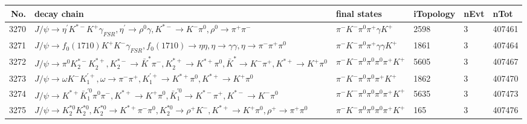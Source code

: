 \begin{table}[htbp] 
\begin{center}
\begin{small}
\begin{tabular}{rlllll}\hline\hline
 No. & decay chain & final states &  iTopology & nEvt & nTot \\\hline
3270&$J/\psi       \rightarrow \eta^{\prime} K^{*-}         K^{+}          \gamma_{FSR} , \eta^{\prime}  \rightarrow \rho^{0}      \gamma       , K^{*-}          \rightarrow K^{-}          \pi^{0}        , \rho^{0}       \rightarrow \pi^{+}        \pi^{-}        $&$\pi^{-}        K^{-}          \pi^{0}        \pi^{+}        \gamma       K^{+}          $& 2598&    3&407461\\
3271&$J/\psi       \rightarrow f_{0}(1710)    K^{+}          K^{-}          \gamma_{FSR} , f_{0}(1710)     \rightarrow \eta          \eta          , \eta           \rightarrow \gamma       \gamma       , \eta           \rightarrow \pi^{-}        \pi^{+}        \pi^{0}        $&$\pi^{-}        K^{-}          \pi^{0}        \pi^{+}        \gamma       \gamma       K^{+}          $& 1861&    3&407464\\
3272&$J/\psi       \rightarrow \pi^{0}        K_2^{*-}       K_2^{*+}       , K_2^{*-}        \rightarrow \bar{K}^{*}   \pi^{-}        , K_2^{*+}        \rightarrow K^{*+}         \pi^{0}        , \bar{K}^{*}    \rightarrow K^{-}          \pi^{+}        , K^{*+}          \rightarrow K^{+}          \pi^{0}        $&$\pi^{-}        K^{-}          \pi^{0}        \pi^{0}        \pi^{0}        \pi^{+}        K^{+}          $& 5605&    3&407467\\
3273&$J/\psi       \rightarrow \omega         K^{-}          K_1^{'+}      , \omega          \rightarrow \pi^{-}        \pi^{+}        , K_1^{'+}       \rightarrow K^{*+}         \pi^{0}        , K^{*+}          \rightarrow K^{+}          \pi^{0}        $&$\pi^{-}        K^{-}          \pi^{0}        \pi^{0}        \pi^{+}        K^{+}          $& 1862&    3&407470\\
3274&$J/\psi       \rightarrow K^{*+}         \bar{K}_1^{'0}\pi^{0}        \pi^{-}        , K^{*+}          \rightarrow K^{+}          \pi^{0}        , \bar{K}_1^{'0} \rightarrow K^{*-}         \pi^{+}        , K^{*-}          \rightarrow K^{-}          \pi^{0}        $&$\pi^{-}        K^{-}          \pi^{0}        \pi^{0}        \pi^{0}        \pi^{+}        K^{+}          $& 5635&    3&407473\\
3275&$J/\psi       \rightarrow K_2^{*0}       K_2^{*0}       , K_2^{*0}        \rightarrow K^{*+}         \pi^{-}        \pi^{0}        , K_2^{*0}        \rightarrow \rho^{+}      K^{-}          , K^{*+}          \rightarrow K^{+}          \pi^{0}        , \rho^{+}       \rightarrow \pi^{+}        \pi^{0}        $&$\pi^{-}        K^{-}          \pi^{0}        \pi^{0}        \pi^{0}        \pi^{+}        K^{+}          $&  165&    3&407476\\

\end{tabular}
\end{small}
\end{center}
\end{table}
